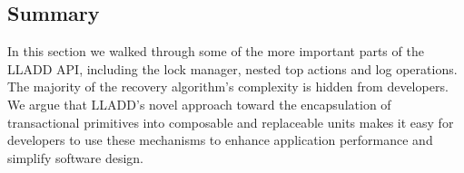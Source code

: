 \documentclass[10pt,letterpaper,twocolumn,english]{article}
\newcommand{\yad}{LLADD\xspace}
\newcommand{\eab}[1]{\textcolor{red}{\bf EAB: #1}}
\begin{document}




\subsection{Summary}

In this section we walked through some of the more important parts of
the \yad API, including the lock manager, nested top actions and log
operations.  The majority of the recovery algorithm's complexity is 
hidden from developers.  We argue that \yad's novel approach toward 
the encapsulation of transactional primitives into composable and replaceable units makes it easy for 
developers to use these mechanisms to enhance application performance
and simplify software design.








\end{document}
